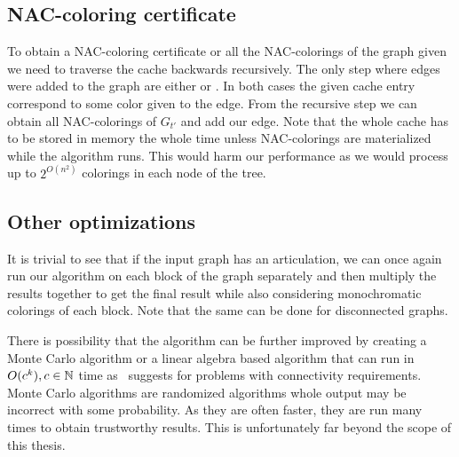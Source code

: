 \subsection{NAC-coloring certificate}

To obtain a NAC-coloring certificate or all the NAC-colorings of the graph
given we need to traverse the cache backwards recursively.
The only step where edges were added to the graph are either \IntroduceEdgeNode{}
or \IntroduceVertexWithEdgesNode{}. In both cases the given cache entry correspond
to some color given to the edge. From the recursive step we can obtain
all NAC-colorings of \( G_{t'} \) and add our edge.
Note that the whole cache has to be stored in memory the whole time unless
NAC-colorings are materialized while the algorithm runs.
This would harm our performance as we would
process up to \( 2^{O(n^2)} \) colorings in each node of the tree.


\subsection{Other optimizations}

It is trivial to see that if the input graph has an articulation,
we can once again run our algorithm on each block of the graph separately
and then multiply the results together to get the final result
while also considering monochromatic colorings of each block.
Note that the same can be done for disconnected graphs.

There is possibility that the algorithm can be further improved by creating
a Monte Carlo algorithm or a linear algebra based algorithm that can run
in \( O(c^k), c \in \mathbb{N} \) time as~\cite{book_parametrized_algorithms} suggests
for problems with connectivity requirements.
Monte Carlo algorithms are randomized algorithms whole output may be incorrect
with some probability. As they are often faster, they are run many times
to obtain trustworthy results.
This is unfortunately far beyond the scope of this thesis.

